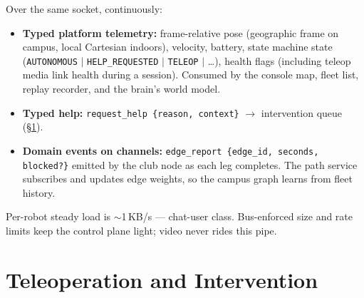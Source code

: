 \documentclass[11pt]{article}
\begin{document}
Over the same socket, continuously:

\begin{itemize}[itemsep=1pt]
  \item \textbf{Typed platform telemetry:} frame-relative pose (geographic frame on
        campus, local Cartesian indoors), velocity, battery, state machine state
        (\texttt{AUTONOMOUS} $|$ \texttt{HELP\_REQUESTED} $|$ \texttt{TELEOP} $|$
        \dots), health flags (including teleop media link health during a session).
        Consumed by the console map, fleet list, replay recorder, and the brain's
        world model.
  \item \textbf{Typed help:} \texttt{request\_help \{reason, context\}} $\to$
        intervention queue (\S\ref{sec:teleop}).
  \item \textbf{Domain events on channels:} \texttt{edge\_report \{edge\_id, seconds,
        blocked?\}} emitted by the club node as each leg completes. The path service
        subscribes and updates edge weights, so the campus graph learns from fleet
        history.
\end{itemize}

Per-robot steady load is $\sim$1\,KB/s --- chat-user class. Bus-enforced size and rate
limits keep the control plane light; video never rides this pipe.

\section{Teleoperation and Intervention}
\label{sec:teleop}
\end{document}
